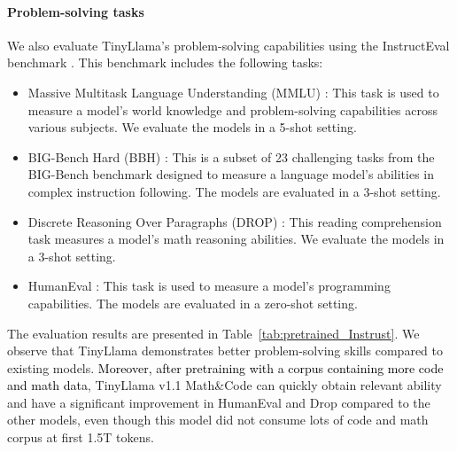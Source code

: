 \documentclass{article}
\begin{document}
\paragraph{Problem-solving tasks}
We also evaluate TinyLlama's problem-solving capabilities using the InstructEval benchmark \citep{DBLP:journals/corr/abs-2306-04757}. This benchmark includes the following tasks:
\begin{itemize}
\item Massive Multitask Language Understanding (MMLU) \citep{hendrycks2020mmlu}: This task is used to measure a model's world knowledge and problem-solving capabilities across various subjects. We evaluate the models in a 5-shot setting.
\item BIG-Bench Hard (BBH) \citep{suzgun2022challenging}: This is a subset of 23 challenging tasks from the BIG-Bench benchmark \citep{srivastava2022beyond} designed to measure a language model's abilities in complex instruction following. The models are evaluated in a 3-shot setting.
\item Discrete Reasoning Over Paragraphs (DROP) \citep{dua2019drop}: This reading comprehension task measures a model's math reasoning abilities. We evaluate the models in a 3-shot setting.
\item HumanEval \citep{DBLP:conf/kdd/ZhengXZDWXSW0LS23}: This task is used to measure a model's programming capabilities. The models are evaluated in a zero-shot setting.
\end{itemize}
The evaluation results are presented in Table~\ref{tab:pretrained_Instrust}.
We observe that TinyLlama demonstrates better problem-solving skills compared to existing models.
\textcolor{black}{Moreover, after pretraining with a corpus containing more code and math data}, TinyLlama v1.1 Math\&Code can quickly obtain relevant ability and have a significant improvement in HumanEval and Drop compared to the other models, even though this model did not consume lots of code and math corpus at first 1.5T tokens.
\vspace{-1em}
\end{document}
